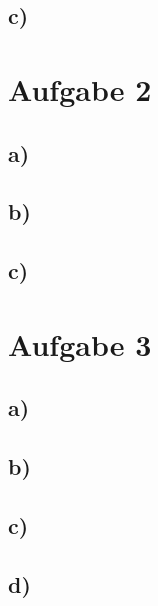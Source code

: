 \subsection{c)}

\section{Aufgabe 2}

\subsection{a)}

\subsection{b)}

\subsection{c)}

\section{Aufgabe 3}

\subsection{a)}

\subsection{b)}

\subsection{c)}

\subsection{d)}

